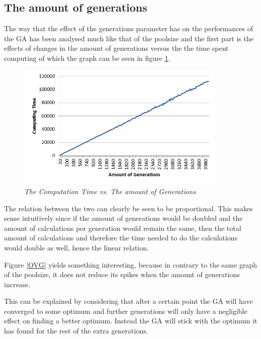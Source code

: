 \subsection{The amount of generations}

\par
The way that the effect of the generations parameter has on the performances of the GA has been analysed much like that of the poolsize and the first part is the effects of changes in the amount of generations versus the the time spent computing of which the graph can be seen in figure \ref{CTG}.

\begin{figure}[H] 
	\centering
	\includegraphics[height=6cm]{CTG}
	\caption{\textsl{The Computation Time vs. The amount of Generations}}
	\label{CTG}
\end{figure}

\par
The relation between the two can clearly be seen to be proportional. This makes sense intuitively since if the amount of generations would be doubled and the amount of calculations per generation would remain the same, then the total amount of calculations and therefore the time needed to do the calculations would double as well, hence the linear relation.

Figure \ref{OVG} yields something interesting, because in contrary to the same graph of the poolsize, it does not reduce its spikes when the amount of generations increase.

\par
This can be explained by considering that after a certain point the GA will have converged to some optimum and further generations will only have a negligible effect on finding a better optimum. Instead the GA will stick with the optimum it has found for the rest of the extra generations.

